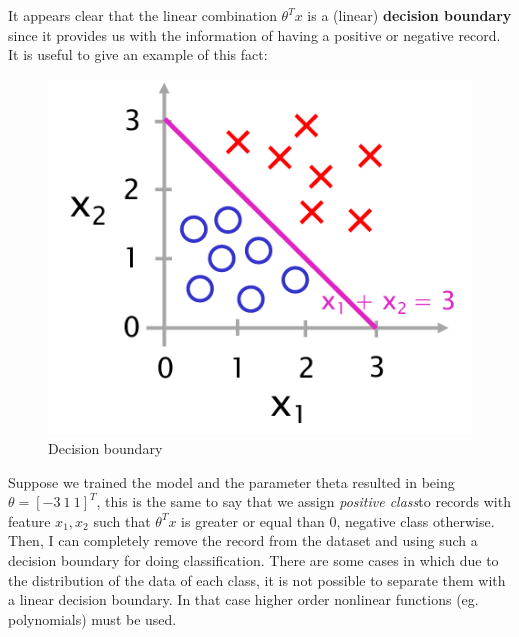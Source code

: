 It appears clear that the linear combination $\theta^T{x}$ is a (linear) \textbf{decision boundary} since it provides us with the information of having a positive or negative record. It is useful to give an example of this fact: 

\begin{figure}[h]
    \centering
    \includegraphics[scale=0.7]{img/decision_boundary1.png}
    \caption{Decision boundary}
\end{figure}

\noindent
Suppose we trained the model and the parameter theta resulted in being $\theta=[-3\  1 \ 1]^T$, this is the same to say that we assign \textit{positive class}to records with feature $x_1, x_2$ such that $\theta^T{x}$ is greater or equal than 0, negative class otherwise. Then, I can completely remove the record from the dataset and using such a decision boundary for doing classification. There are some cases in which due to the distribution of the data of each class, it is not possible to separate them with a linear decision boundary. In that case higher order nonlinear functions (eg. polynomials) must be used.

